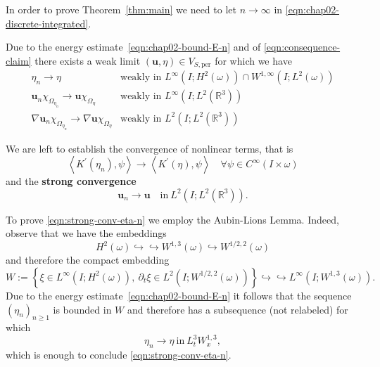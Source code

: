 \documentclass[10pt,a4paper]{article}
\numberwithin{equation}{section}
\begin{document}
In order to prove Theorem~\ref{thm:main} we need to let $n\to \infty$ in \eqref{eqn:chap02-discrete-integrated}.

Due to the energy estimate~\eqref{eqn:chap02-bound-E-n} and of \eqref{eqn:consequence-claim} there exists a weak limit $(\mathbf{u},\eta)\in V_{S,\text{per}}$ for which we have 
\begin{equation}
    \begin{aligned}\eta_{n}\to\eta & \text{weakly in }L^{\infty}\left(I;H^{2}\left(\omega\right)\right)\cap W^{1,\infty}\left(I;L^{2}\left(\omega\right)\right)\\
\mathbf{u}_{n}\chi_{\Omega_{\eta_{n}}}\to\mathbf{u}\chi_{\Omega_{\eta}} & \text{weakly in }L^{\infty}\left(I;L^{2}\left(\mathbb{R}^{3}\right)\right)\\
\nabla\mathbf{u}_{n}\chi_{\Omega_{\eta_{n}}}\to\nabla\mathbf{u}\chi_{\Omega_{\eta}} & \text{weakly in }L^{2}\left(I;L^{2}\left(\mathbb{R}^{3}\right)\right)
\end{aligned}
\end{equation}


We are left to establish the convergence of nonlinear terms, that is 
\begin{equation}\label{eqn:strong-conv-eta-n}
\left\langle K^{\prime}\left(\eta_{n}\right),\psi\right\rangle \to\left\langle K^{\prime}\left(\eta\right),\psi\right\rangle \quad\forall\psi\in C^{\infty}\left(I\times\omega\right)
\end{equation}
and the \textbf{strong convergence}
\begin{equation}\label{eqn:strong-conv-u-n}
\mathbf{u}_{n}\to\mathbf{u}\quad\text{in}\ L^{2}\left(I;L^{2}\left(\mathbb{R}^{3}\right)\right).
\end{equation}

To prove \eqref{eqn:strong-conv-eta-n} we employ the Aubin-Lions Lemma. Indeed, observe that we have the embeddings
\[
H^{2}\left(\omega\right)\hookrightarrow\hookrightarrow W^{1,3}\left(\omega\right)\hookrightarrow W^{1/2,2}\left(\omega\right)
\]
and therefore the compact embedding
\[
W:=\left\{ \xi\in L^{\infty}\left(I;H^{2}\left(\omega\right)\right),\ \partial_{t}\xi\in L^{2}\left(I;W^{1/2,2}\left(\omega\right)\right)\right\} \hookrightarrow\hookrightarrow L^{\infty}\left(I;W^{1,3}\left(\omega\right)\right).
\]
Due to the energy estimate~\eqref{eqn:chap02-bound-E-n} it follows that the sequence $(\eta_n)_{n\ge 1}$ is bounded in $W$ and therefore has a subsequence (not relabeled) for which 
\begin{equation}
\eta_{n}\to\eta\ \text{in}\ L_{t}^{3}W_{x}^{1,3},
\end{equation} 
which is enough to conclude \eqref{eqn:strong-conv-eta-n}.
\end{document}
